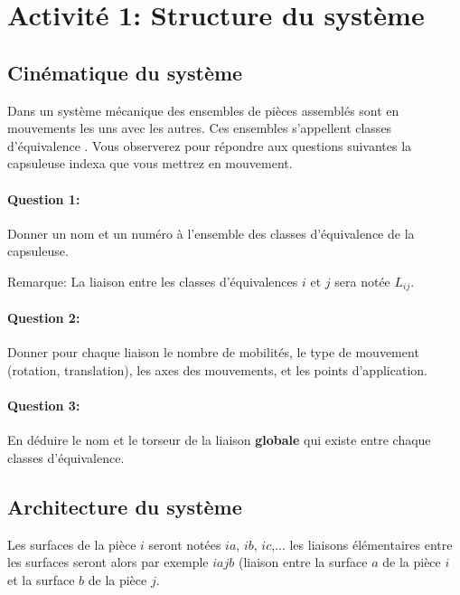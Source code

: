 

\section{Activité 1: Structure du système}

\subsection{Cinématique du système}

Dans un système mécanique des ensembles de pièces assemblés sont en mouvements les uns avec les autres. Ces ensembles s'appellent \og classes d'équivalence \fg. Vous observerez pour répondre aux questions suivantes la capsuleuse indexa que vous mettrez en mouvement.

\paragraph{Question 1:} Donner un nom et un  numéro à l'ensemble des classes d'équivalence de la capsuleuse.

\reponse[3]

Remarque: La liaison entre les classes d'équivalences $i$ et $j$ sera notée $L_{ij}$.

\paragraph{Question 2:} Donner pour chaque liaison le nombre de mobilités, le type de mouvement (rotation, translation), les axes des mouvements, et les points d'application.

\reponse[3]

\paragraph{Question 3:} En déduire le nom et le torseur de la liaison \textbf{globale} qui existe entre chaque classes d'équivalence.

\reponse[3]

\subsection{Architecture du système}

Les surfaces de la pièce $i$ seront notées $ia$, $ib$, $ic$,... les liaisons élémentaires entre les surfaces seront alors par exemple $iajb$ (liaison entre la surface $a$ de la pièce $i$ et la surface $b$ de la pièce $j$.

